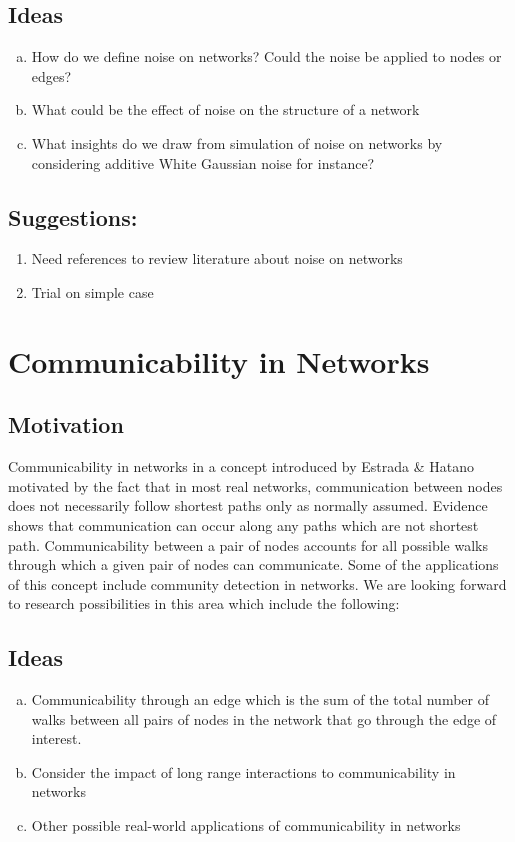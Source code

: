 \documentclass[10pt,a4paper]{article}
\begin{document}
	\subsection{Ideas}
	\begin{enumerate}[a)]
		\item How do we define noise on networks? Could the noise be applied to nodes or edges? 
		\item What could be the effect of noise on the structure of a network
		\item What insights do we draw from simulation of noise on networks by considering additive White Gaussian noise for instance?
	\end{enumerate}

	\subsection{Suggestions:}
    \begin{enumerate}
	\item Need references to review literature about noise on networks
	\item Trial on simple case 
    \end{enumerate}

	\section{Communicability in Networks}
	\subsection{Motivation}
	Communicability in networks in a concept introduced by Estrada \& Hatano \citep{estrada2008communicability} motivated by the fact that in most real networks, communication between nodes does not necessarily follow shortest paths only as normally assumed. Evidence shows that communication can occur along any paths which are not shortest path. Communicability between a pair of nodes accounts for all possible walks through which a given pair of nodes can communicate. Some of the applications of this concept include community detection in networks. We are looking forward to research possibilities in this area which include the following: 
	\subsection{Ideas}
	\begin{enumerate}[a)]
		\item Communicability through an edge which is the sum of the total number of walks between all pairs of nodes in the network that go through the edge of interest.
		\item Consider the impact of long range interactions to communicability in networks
		\item Other possible real-world applications of communicability in networks
	\end{enumerate}
	
\end{document}
